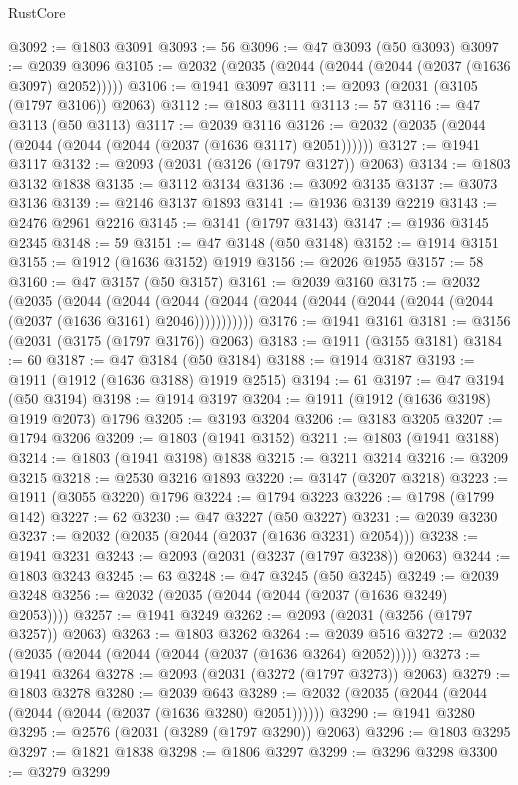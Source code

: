 \begin{lexlean}{RustCore}
\begin{coremodule}
@3092 := @1803 @3091
@3093 := 56
@3096 := @47 @3093 (@50 @3093)
@3097 := @2039 @3096
@3105 := @2032 (@2035 (@2044 (@2044 (@2044 (@2037 (@1636 @3097) @2052)))))
@3106 := @1941 @3097
@3111 := @2093 (@2031 (@3105 (@1797 @3106)) @2063)
@3112 := @1803 @3111
@3113 := 57
@3116 := @47 @3113 (@50 @3113)
@3117 := @2039 @3116
@3126 := @2032 (@2035 (@2044 (@2044 (@2044 (@2044 (@2037 (@1636 @3117) @2051))))))
@3127 := @1941 @3117
@3132 := @2093 (@2031 (@3126 (@1797 @3127)) @2063)
@3134 := @1803 @3132 @1838
@3135 := @3112 @3134
@3136 := @3092 @3135
@3137 := @3073 @3136
@3139 := @2146 @3137 @1893
@3141 := @1936 @3139 @2219
@3143 := @2476 @2961 @2216
@3145 := @3141 (@1797 @3143)
@3147 := @1936 @3145 @2345
@3148 := 59
@3151 := @47 @3148 (@50 @3148)
@3152 := @1914 @3151
@3155 := @1912 (@1636 @3152) @1919
@3156 := @2026 @1955
@3157 := 58
@3160 := @47 @3157 (@50 @3157)
@3161 := @2039 @3160
@3175 := @2032
    (@2035
      (@2044
        (@2044
          (@2044 (@2044 (@2044 (@2044 (@2044 (@2044 (@2044 (@2037 (@1636 @3161) @2046)))))))))))
@3176 := @1941 @3161
@3181 := @3156 (@2031 (@3175 (@1797 @3176)) @2063)
@3183 := @1911 (@3155 @3181)
@3184 := 60
@3187 := @47 @3184 (@50 @3184)
@3188 := @1914 @3187
@3193 := @1911 (@1912 (@1636 @3188) @1919 @2515)
@3194 := 61
@3197 := @47 @3194 (@50 @3194)
@3198 := @1914 @3197
@3204 := @1911 (@1912 (@1636 @3198) @1919 @2073) @1796
@3205 := @3193 @3204
@3206 := @3183 @3205
@3207 := @1794 @3206
@3209 := @1803 (@1941 @3152)
@3211 := @1803 (@1941 @3188)
@3214 := @1803 (@1941 @3198) @1838
@3215 := @3211 @3214
@3216 := @3209 @3215
@3218 := @2530 @3216 @1893
@3220 := @3147 (@3207 @3218)
@3223 := @1911 (@3055 @3220) @1796
@3224 := @1794 @3223
@3226 := @1798 (@1799 @142)
@3227 := 62
@3230 := @47 @3227 (@50 @3227)
@3231 := @2039 @3230
@3237 := @2032 (@2035 (@2044 (@2037 (@1636 @3231) @2054)))
@3238 := @1941 @3231
@3243 := @2093 (@2031 (@3237 (@1797 @3238)) @2063)
@3244 := @1803 @3243
@3245 := 63
@3248 := @47 @3245 (@50 @3245)
@3249 := @2039 @3248
@3256 := @2032 (@2035 (@2044 (@2044 (@2037 (@1636 @3249) @2053))))
@3257 := @1941 @3249
@3262 := @2093 (@2031 (@3256 (@1797 @3257)) @2063)
@3263 := @1803 @3262
@3264 := @2039 @516
@3272 := @2032 (@2035 (@2044 (@2044 (@2044 (@2037 (@1636 @3264) @2052)))))
@3273 := @1941 @3264
@3278 := @2093 (@2031 (@3272 (@1797 @3273)) @2063)
@3279 := @1803 @3278
@3280 := @2039 @643
@3289 := @2032 (@2035 (@2044 (@2044 (@2044 (@2044 (@2037 (@1636 @3280) @2051))))))
@3290 := @1941 @3280
@3295 := @2576 (@2031 (@3289 (@1797 @3290)) @2063)
@3296 := @1803 @3295
@3297 := @1821 @1838
@3298 := @1806 @3297
@3299 := @3296 @3298
@3300 := @3279 @3299

\end{coremodule}
\end{lexlean}
